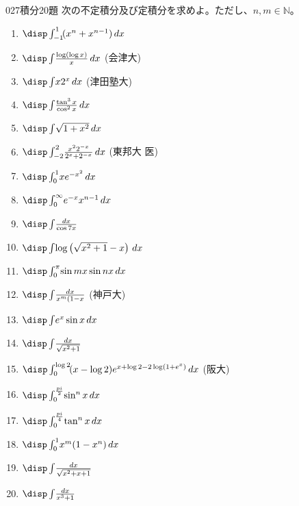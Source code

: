 \begin{prob}{027}{}{積分20題}
 次の不定積分及び定積分を求めよ。ただし、$n, m\in\mathbb{N}$。
 \begin{enumerate}
  \item $\disp \int_{-1}^1\! (x^n+x^{n-1}) \,dx$
  \item $\disp \int\! \frac{\log\left(\log x\right)}{x} \,dx$ (会津大)
  \item $\disp \int\! x2^x \,dx$ (津田塾大)
  \item $\disp \int\! \frac{\tan^3 x}{\cos^2 x} \,dx$
  \item $\disp \int\! \sqrt{1+x^2} \,dx$
  \item $\disp \int_{-2}^2\! \frac{x^2 2^{-x}}{2^x+2^{-x}} \,dx$ (東邦大 医)
  \item $\disp \int_0^1\! xe^{-x^2} \,dx$
  \item $\disp \int_0^\infty\! e^{-x}x^{n-1} \,dx$
  \item $\disp \int\! \frac{dx}{\cos 7x}$
  \item $\disp \int\! \log\left(\sqrt{x^2+1}-x\right) \,dx$
  \item $\disp \int_0^\pi\! \sin mx \sin nx \,dx$
  \item $\disp \int\! \frac{dx}{x^m(1-x}$ (神戸大)
  \item $\disp \int\! e^x\sin x \,dx$
  \item $\disp \int\! \frac{dx}{\sqrt{x^2+1}}$
  \item $\disp \int_0^{\log 2}\! (x-\log 2)e^{x+\log 2 -2\log (1+e^x)} \,dx$ (阪大)
  \item $\disp \int_0^{\frac{pi}{2}}\! \sin^n x \,dx$
  \item $\disp \int_0^{\frac{pi}{4}}\! \tan^n x \,dx$
  \item $\disp \int_0^1\! x^m(1-x^n) \,dx$
  \item $\disp \int\! \frac{dx}{\sqrt{x^2+x+1}}$
  \item $\disp \int\! \frac{dx}{x^3+1}$
 \end{enumerate}
\end{prob}


